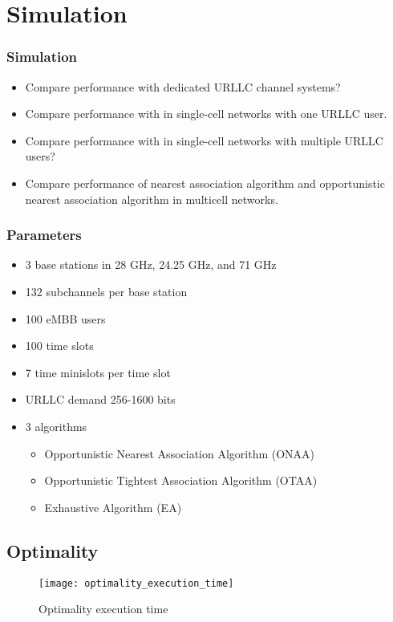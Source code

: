 \section{Simulation}
\begin{frame}
  \frametitle{Simulation}
  \begin{itemize}
    \item Compare performance with dedicated URLLC channel systems?
    \item Compare performance with \cite{AVS20} in single-cell networks with one URLLC user.
    \item Compare performance with \cite{YZR21} in single-cell networks with multiple URLLC users?
    \item Compare performance of nearest association algorithm and opportunistic nearest association algorithm in multicell networks.
  \end{itemize}
\end{frame}

\begin{frame}
  \frametitle{Parameters}
  \begin{itemize}
    \item 3 base stations in 28 GHz, 24.25 GHz, and 71 GHz \cite{SRRTGKRKPJ16}
    \item 132 subchannels per base station
    \item 100 eMBB users
    \item 100 time slots
    \item 7 time minislots per time slot
    \item URLLC demand 256-1600 bits \cite{3GPP17}
    \item 3 algorithms
      \begin{itemize}
        \item Opportunistic Nearest Association Algorithm (ONAA)
        \item Opportunistic Tightest Association Algorithm (OTAA)
        \item Exhaustive Algorithm (EA)
      \end{itemize}
  \end{itemize}
\end{frame}

\subsection{Optimality}
\begin{frame}
  \begin{figure}
    \texttt{[image: optimality\_execution\_time]}
    \caption{Optimality execution time}
  \end{figure}
\end{frame}


